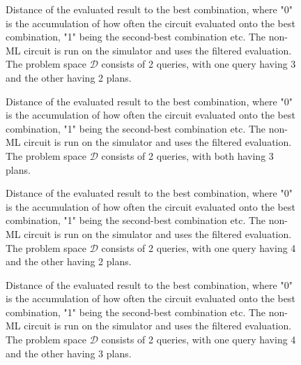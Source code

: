\begin{figure}[!h]
    \centering
    \scalebox{\resultboxplot}{
        
    }
    \caption{Distance of the evaluated result to the best combination, where "0" is the accumulation of how often the circuit evaluated onto the best combination, "1" being the second-best combination etc. The non-ML circuit is run on the simulator and uses the filtered evaluation. The problem space $\mathcal{D}$ consists of 2 queries, with one query having 3 and the other having 2 plans.}
    \label{figure:bars_dist_3_2}
\end{figure}

\begin{figure}[!h]
    \centering
    \scalebox{\resultboxplot}{
        
    }
    \caption{Distance of the evaluated result to the best combination, where "0" is the accumulation of how often the circuit evaluated onto the best combination, "1" being the second-best combination etc. The non-ML circuit is run on the simulator and uses the filtered evaluation. The problem space $\mathcal{D}$ consists of 2 queries, with both having 3 plans.}
    \label{figure:bars_dist_3_3}
\end{figure}

\begin{figure}[!ht]
    \centering
    \scalebox{\resultboxplot}{
        
    }
    \caption{Distance of the evaluated result to the best combination, where "0" is the accumulation of how often the circuit evaluated onto the best combination, "1" being the second-best combination etc. The non-ML circuit is run on the simulator and uses the filtered evaluation. The problem space $\mathcal{D}$ consists of 2 queries, with one query having 4 and the other having 2 plans.}
    \label{figure:bars_dist_4_2}
\end{figure}

\begin{figure}[!h]
    \centering
    \scalebox{\resultboxplot}{
        
    }
    \caption{Distance of the evaluated result to the best combination, where "0" is the accumulation of how often the circuit evaluated onto the best combination, "1" being the second-best combination etc. The non-ML circuit is run on the simulator and uses the filtered evaluation. The problem space $\mathcal{D}$ consists of 2 queries, with one query having 4 and the other having 3 plans.}
    \label{figure:bars_dist_4_3}
\end{figure}

